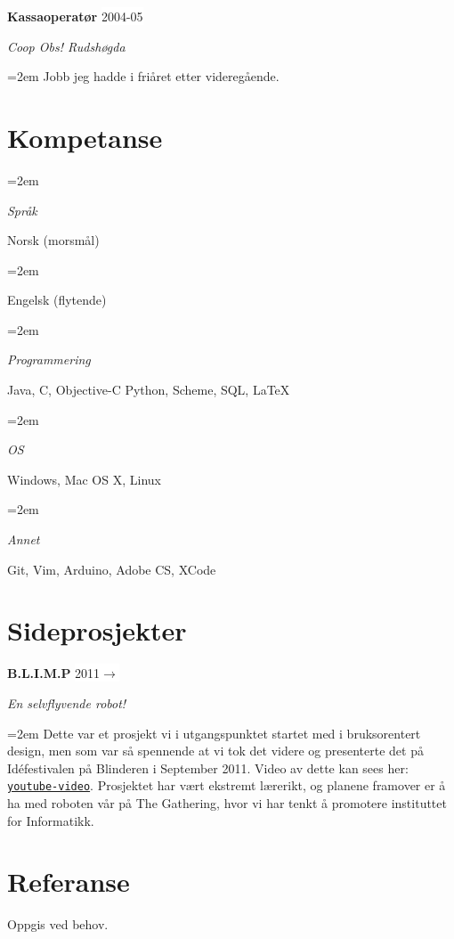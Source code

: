 \documentclass[paper=a4, fontsize=11pt]{scrartcl}
\newlength{\skillbox}
\newcommand{\sepspace}{\vspace*{1em}}
\newcommand{\SkillsEntry}[2]{						
		\noindent\hangindent=2em\hangafter=0 		%
		\parbox{\skillbox}{						%
		\textit{#1}}								%
		\hspace{1.5em} #2 \par}					%
\newcommand{\EducationEntry}[4]{ 
    \noindent \textbf{#1} \hfill 
    \colorbox{White}{%
        \parbox{6em}{%
        \hfill\color{Black}#2}} \par 
    \noindent \textit{#3} \par 
    \noindent\hangindent=2em\hangafter=0 \small #4 
    \normalsize \par}
\newcommand{\WorkEntry}[4]{						%
		\noindent \textbf{#1} \hfill 					%
		\colorbox{White}{\color{Black}#2} \par		%
		\noindent \textit{#3} \par					%
		\noindent\hangindent=2em\hangafter=0 \small #4 	%
		\normalsize \par}
\begin{document}
\newpage
\WorkEntry
{Kassaoperatør}
{2004-05}
{Coop Obs! Rudshøgda}
{Jobb jeg hadde i friåret etter videregående.}
\sepspace

\sepspace
\section*{Kompetanse}
\SkillsEntry{Språk}{Norsk (morsmål)}
\SkillsEntry{}{Engelsk (flytende)}
\sepspace
\SkillsEntry{Programmering}{Java, C, Objective-C Python, Scheme, SQL, \LaTeX}
\sepspace
\SkillsEntry{OS}{Windows, Mac OS X, Linux}
\sepspace
\SkillsEntry{Annet}{Git, Vim, Arduino, Adobe CS, XCode}

\sepspace
\sepspace
\section*{Sideprosjekter}
\WorkEntry
{B.L.I.M.P}
{2011$\rightarrow$}
{En selvflyvende robot!}
{Dette var et prosjekt vi i utgangspunktet startet med i bruksorentert
design, men som var så spennende at vi tok det videre og presenterte det
på Idéfestivalen på Blinderen i September 2011. Video av dette kan sees
her: \href{http://www.bit.ly/ifiblimp}{\tt{youtube-video}}. Prosjektet
har vært ekstremt lærerikt, og planene framover er å ha med roboten vår
på The Gathering, hvor vi har tenkt å promotere instituttet for
Informatikk.}

\sepspace
\sepspace
\section*{Referanse}
Oppgis ved behov.
\end{document}

